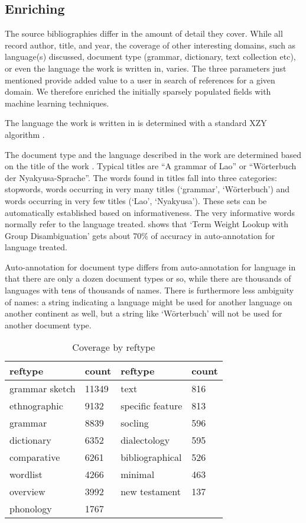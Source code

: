 \documentclass[10pt, a4paper]{article}
\begin{document}
\subsection{Enriching}
The source bibliographies differ in the amount of detail they cover. While all record author, title, and year, the coverage of other interesting domains, such as language(s) discussed, document type (grammar, dictionary, text collection etc), or even the language the work is written in, varies. The three parameters just mentioned provide added value to a user in search of references for a given domain. We therefore enriched the initially sparsely populated fields with machine learning techniques.

The language the work is written in is determined with a standard XZY algorithm \cite{abc}.

The document type and the language described in the work are determined based on the title of the work \cite{Hammarstroem2008,HammarstroemEtAl2011oslo}. Typical titles are ``A grammar of Lao'' or ``W\"orterbuch der Nyakyusa-Sprache''. The words found in titles fall into three categories: stopwords, words occurring in very many titles (`grammar', `W\"orterbuch') and words occurring in very few titles (`Lao', `Nyakyusa'). These sets can be automatically established based on informativeness. The very informative words normally refer to the language treated. \cite{Hammarstroem2008} shows that `Term Weight Lookup with Group Disambiguation' gets about 70\% of accuracy in auto-annotation for language treated.

Auto-annotation for document type differs from auto-annotation for language in that there are only a dozen document types or so, while there are thousands of languages with tens of thousands of names. There is furthermore less ambiguity of names: a string indicating a language might be used for another language on another continent as well, but a string like `W\"orterbuch' will not be used for another document type. 

 



\begin{table}
\begin{tabular}{ll||ll}
   reftype & count & reftype & count  \\
\hline
 grammar sketch & 11349 & text  		& 816 \\
 ethnographic 	& 9132  & specific feature 	& 813 \\
 grammar  	& 8839  & socling  		& 596 \\
 dictionary 	& 6352  & dialectology 		& 595 \\
 comparative 	& 6261  & bibliographical 	& 526 \\
 wordlist  	& 4266  & minimal  		& 463 \\
 overview  	& 3992  & new testament 	& 137 \\
 phonology 	& 1767  &   			& \\
\end{tabular}
\caption{Coverage by reftype}
\end{table}
\end{document}
